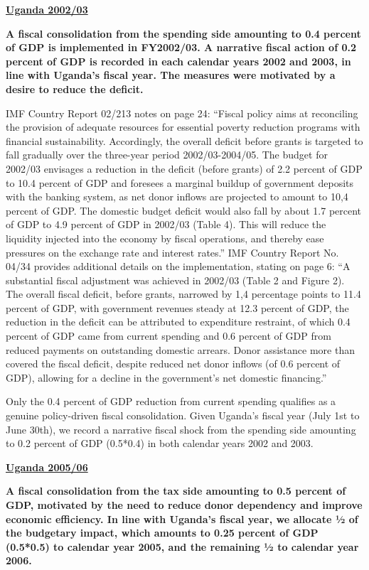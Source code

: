 \textbf{\underline{Uganda 2002/03}}

\textbf{A fiscal consolidation from the spending side amounting to 0.4 percent of GDP is implemented in FY2002/03. A narrative fiscal action of 0.2 percent of GDP is recorded in each calendar years 2002 and 2003, in line with Uganda’s fiscal year. The measures were motivated by a desire to reduce the deficit.}

IMF Country Report 02/213 notes on page 24: “Fiscal policy aims at reconciling the provision of adequate resources for essential poverty reduction programs with financial sustainability. Accordingly, the overall deficit before grants is targeted to fall gradually over the three-year period 2002/03-2004/05. The budget for 2002/03 envisages a reduction in the deficit (before grants) of 2.2 percent of GDP to 10.4 percent of GDP and foresees a marginal buildup of government deposits with the banking system, as net donor inflows are projected to amount to 10,4 percent of GDP. The domestic budget deficit would also fall by about 1.7 percent of GDP to 4.9 percent of GDP in 2002/03 (Table 4). This will reduce the liquidity injected into the economy by fiscal operations, and thereby ease pressures on the exchange rate and interest rates.”
IMF Country Report No. 04/34 provides additional details on the implementation, stating on page 6: “A substantial fiscal adjustment was achieved in 2002/03 (Table 2 and Figure 2). The overall fiscal deficit, before grants, narrowed by 1,4 percentage points to 11.4 percent of GDP, with government revenues steady at 12.3 percent of GDP, the reduction in the deficit can be attributed to expenditure restraint, of which 0.4 percent of GDP came from current spending and 0.6 percent of GDP from reduced payments on outstanding domestic arrears. Donor assistance more than covered the fiscal deficit, despite reduced net donor inflows (of 0.6 percent of GDP), allowing for a decline in the government's net domestic financing.”

Only the 0.4 percent of GDP reduction from current spending qualifies as a genuine policy-driven fiscal consolidation. Given Uganda’s fiscal year (July 1st to June 30th), we record a narrative fiscal shock from the spending side amounting to 0.2 percent of GDP (0.5*0.4) in both calendar years 2002 and 2003.

\textbf{\underline{Uganda 2005/06}}

\textbf{A fiscal consolidation from the tax side amounting to 0.5 percent of GDP, motivated by the need to reduce donor dependency and improve economic efficiency. In line with Uganda’s fiscal year, we allocate ½ of the budgetary impact, which amounts to 0.25 percent of GDP (0.5*0.5) to calendar year 2005, and the remaining ½ to calendar year 2006.}

